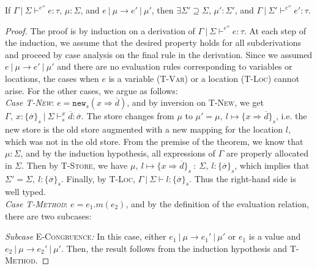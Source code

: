 \documentclass{llncs}
\newcommand{\keywadj}[1]{\mathtt{#1}}
\begin{document}
\vspace{6pt}

\begin{theorem}[Preservation]
If $\Gamma~|~\Sigma \vdash^{e''} e : \tau$, $\mu : \Sigma$, and $e~|~\mu \longrightarrow e'~|~\mu'$, then $\exists \Sigma' \supseteq \Sigma$, $\mu' : \Sigma'$, and $\Gamma~|~\Sigma' \vdash^{e''} e' : \tau$.

\end{theorem}

\begin{proof} The proof is by induction on a derivation of $\Gamma~|~\Sigma \vdash^{e''} e : \tau$. At each step of the induction, we assume that the desired property holds for all subderivations and proceed by case analysis on the final rule in the derivation. Since we assumed $e~|~\mu \longrightarrow e'~|~\mu'$ and there are no evaluation rules corresponding to variables or locations, the cases when $e$ is a variable (\textsc{T-Var}) or a location (\textsc{T-Loc}) cannot arise. For the other cases, we argue as follows:
\\

\noindent\textit{Case \textsc{T-New}}:
$e = \keywadj{new}_{s}(x \Rightarrow \overline{d})$, and by inversion on \textsc{T-New}, we get $\Gamma,~x : \{ \overline{\sigma} \}_{s}~|~\Sigma \vdash^x_s \overline{d} : \overline{\sigma}$. The store changes from $\mu$ to $\mu' = \mu,~l \mapsto \{ x \Rightarrow \overline{d} \}_s$, i.e. the new store is the old store augmented with a new mapping for the location $l$, which was not in the old store. From the premise of the theorem, we know that $\mu : \Sigma$, and by the induction hypothesis, all expressions of $\Gamma$ are properly allocated in $\Sigma$. Then by \textsc{T-Store}, we have $\mu,~l \mapsto \{ x \Rightarrow \overline{d} \}_s~:~\Sigma,~l : \{ \overline{\sigma} \}_s$, which implies that $\Sigma' = \Sigma,~l : \{ \overline{\sigma} \}_s$. Finally, by \textsc{T-Loc}, $\Gamma~|~\Sigma \vdash l : \{ \overline{\sigma} \}_s$. Thus the right-hand side is well typed.
\\

\noindent\textit{Case \textsc{T-Method}}:
$e = e_1.m(e_2)$, and by the definition of the evaluation relation, there are two subcases:

\textit{Subcase} \textsc{E-Congruence}\textit{:} In this case, either $e_1~|~\mu \longrightarrow e_1'~|~\mu'$ or $e_1$ is a value and $e_2~|~\mu \longrightarrow e_2'~|~\mu'$. Then, the result follows from the induction hypothesis and \textsc{T-Method}.


\end{proof}
\end{document}
